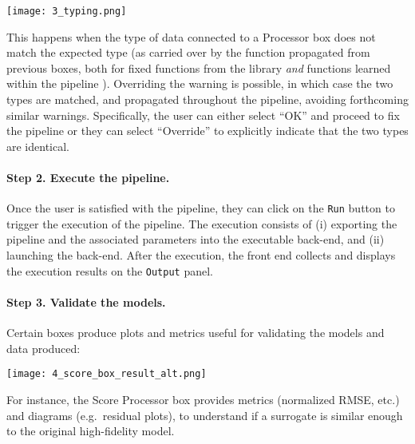 \texttt{[image: 3\_typing.png]}

This happens when the type of data connected to a Processor box does not match the expected type (as carried over by the function propagated from previous boxes, both for fixed functions from the {\Builder} library {\em and} functions learned within the pipeline \cite{decontoFunction+DataFlowFramework2024}). Overriding the warning is possible, in which case the two types are matched, and propagated throughout the pipeline, avoiding forthcoming similar warnings. 
%
Specifically, the user can either select ``OK'' and proceed to fix the pipeline or they can select ``Override'' to explicitly indicate that the two types are identical.


\paragraph{Step 2. Execute the pipeline.}
Once the user is satisfied with the pipeline, they can click on the \texttt{Run} button to trigger the execution of the pipeline. The execution consists of 
(i) exporting the pipeline and the associated parameters into the executable back-end,
and (ii) launching the back-end. After the execution, the front end collects and displays the execution results on the \texttt{Output} panel. %


\paragraph{Step 3. Validate the models.}

Certain boxes produce plots and metrics useful for validating the models and data produced:

\texttt{[image: 4\_score\_box\_result\_alt.png]}

For instance, the Score Processor box provides metrics (normalized RMSE, etc.) and diagrams (e.g.\ residual plots), to understand if a surrogate is similar enough to the original high-fidelity model.
